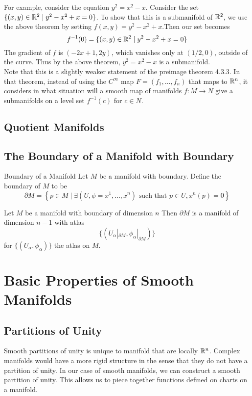 \documentclass[a4paper]{article}
\begin{document}
For example, consider the equation $y^2=x^2-x$. Consider the set $\{(x,y)\in\mathbb{R}^2\;|\;y^2-x^2+x=0\}$. To show that this is a submanifold of $\mathbb{R}^2$, we use the above theorem by setting $f(x,y)=y^2-x^2+x$.Then our set becomes $$f^{-1}(0)=\{(x,y)\in\mathbb{R}^2\;|\;y^2-x^2+x=0\}$$ The gradient of $f$ is $(-2x+1,2y)$, which vanishes only at $(1/2,0)$, outside of the curve. Thus by the above theorem, $y^2=x^2-x$ is a submanifold. \\

Note that this is a slightly weaker statement of the preimage theorem 4.3.3. In that theorem, instead of using the $C^\infty$ map $F=(f_1,\dots,f_n)$ that maps to $\mathbb{R}^n$, it considers in what situation will a smooth map of manifolds $f:M\to N$ give a submanifolds on a level set $f^{-1}(c)$ for $c\in N$. 

\subsection{Quotient Manifolds}

\subsection{The Boundary of a Manifold with Boundary}
\begin{defn}{Boundary of a Manifold}{} Let $M$ be a manifold with boundary. Define the boundary of $M$ to be $$\partial M=\left\{p\in M\;|\;\exists(U,\phi=x^1,\dots,x^n)\text{ such that }p\in U, x^n(p)=0\right\}$$
\end{defn}

\begin{prp}{}{} Let $M$ be a manifold with boundary of dimension $n$ Then $\partial M$ is a manifold of dimension $n-1$ with atlas $$\{(U_\alpha|_{\partial M},\phi_\alpha|_{\partial M})\}$$ for $\{(U_\alpha,\phi_\alpha)\}$ the atlas on $M$. 
\end{prp}

\pagebreak
\section{Basic Properties of Smooth Manifolds}
\subsection{Partitions of Unity}
Smooth partitions of unity is unique to manifold that are locally $\mathbb{R}^n$. Complex manifolds would have a more rigid structure in the sense that they do not have a partition of unity. In our case of smooth manifolds, we can construct a smooth partition of unity. This allows us to piece together functions defined on charts on a manifold. 
\end{document}
